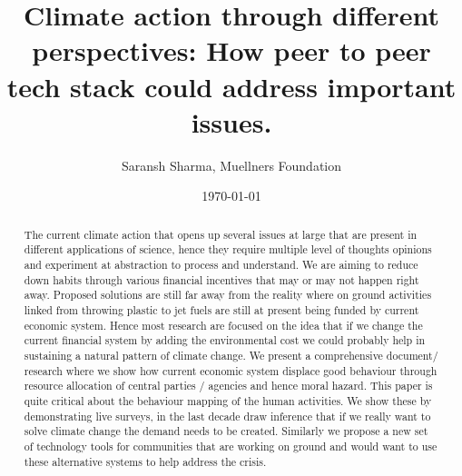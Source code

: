 \documentclass[11pt]{article}
\title{ Climate action through different perspectives: How peer to peer tech stack could address important issues. }
\author{ Saransh Sharma, Muellners Foundation }
\date{\today}
\begin{document}
\maketitle
\begin{abstract}

The current climate action that opens up several issues at large that are present in different applications of science, hence they require multiple level of thoughts opinions and experiment at abstraction to process and understand. We are aiming to reduce down habits through various financial incentives that may or may not happen right away. Proposed solutions are still far away from the reality where on ground activities linked from throwing plastic to jet fuels are still at present being funded by current economic system. Hence most research are focused on the idea that if we change the current financial system by adding the environmental cost  we could probably help in sustaining a natural pattern of climate change. We present a comprehensive document/ research where we show how current economic system displace good behaviour through resource allocation of central parties / agencies and hence moral hazard. This paper is quite critical about the behaviour mapping of the human  activities. We show these by demonstrating live surveys, in the last decade draw inference that if we really want to solve climate change the demand needs to be created. Similarly we propose a new set of technology tools for communities that are working on ground and would want to use these alternative systems to help address the crisis.

\end{abstract} 
\end{document}
